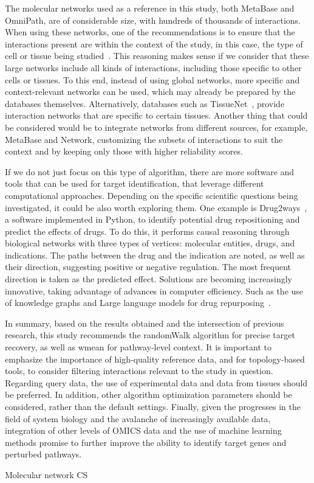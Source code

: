 The molecular networks used as a reference in this study, both MetaBase and OmniPath, are of considerable size, with hundreds of thousands of interactions. When using these networks, one of the recommendations is to ensure that the interactions present are within the context of the study, in this case, the type of cell or tissue being studied~\cite{RN38}. This reasoning makes sense if we consider that these large networks include all kinds of interactions, including those specific to other cells or tissues. To this end, instead of using global networks, more specific and context-relevant networks can be used, which may already be prepared by the databases themselves. Alternatively, databases such as TissueNet~\cite{RN137}, provide interaction networks that are specific to certain tissues. Another thing that could be considered would be to integrate networks from different sources, for example, MetaBase and Network, customizing the subsets of interactions to suit the context and by keeping only those with higher reliability scores. 

If we do not just focus on this type of algorithm, there are more software and tools that can be used for target identification, that leverage different computational approaches. Depending on the specific scientific questions being investigated, it could be also worth exploring them. One example is Drug2ways~\cite{RN132}, a software implemented in Python, to identify potential drug repositioning and predict the effects of drugs. To do this, it performs causal reasoning through biological networks with three types of vertices: molecular entities, drugs, and indications. The paths between the drug and the indication are noted, as well as their direction, suggesting positive or negative regulation. The most frequent direction is taken as the predicted effect. Solutions are becoming increasingly innovative, taking advantage of advances in computer efficiency. Such as the use of knowledge graphs and Large language models for drug repurposing~\cite{RN163}. 

In summary, based on the results obtained and the intersection of previous research, this study recommends the randomWalk algorithm for precise target recovery, as well as wmean for pathway-level context. It is important to emphasize the importance of high-quality reference data, and for topology-based tools, to consider filtering interactions relevant to the study in question. Regarding query data, the use of experimental data and data from tissues should be preferred. In addition, other algorithm optimization parameters should be considered, rather than the default settings. Finally, given the progresses in the field of system biology and the avalanche of increasingly available data, integration of other levels of OMICS data and the use of machine learning methods promise to further improve the ability to identify target genes and perturbed pathways.


\gls{Molecular network}
\gls{CS}

